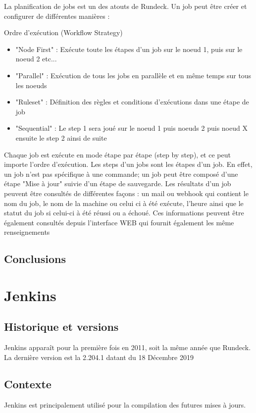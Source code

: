 \documentclass[12pt]{article}
\begin{document}
La planification de jobs est un des atouts de Rundeck. Un job peut être créer et configurer de différentes manières :
\vspace{0.5cm}

Ordre d'exécution (Workflow Strategy)

\vspace{0.5cm}

\begin{itemize}
    \item  "Node First" : Exécute toute les étapes d'un job sur le noeud 1, puis sur le noeud 2 etc...
	\item "Parallel" : Exécution de tous les jobs en parallèle et en même temps sur tous les noeuds
	\item "Ruleset" : Définition des règles et conditions d'exécutions dans une étape de job
	\item "Sequential" : Le step 1 sera joué sur le noeud 1 puis noeuds 2 puis noeud X ensuite le step 2 ainsi de suite
\end{itemize}

\vspace{0.5cm}
Chaque job est exécute en mode étape par étape (step by step), et ce peut importe l'ordre d'exécution.
Les steps d'un jobs sont les étapes d'un job. En effet, un job n'est pas spécifique à une commande; un job peut être composé d'une étape "Mise à jour" suivie d'un étape de sauvegarde.
Les résultats d'un job peuvent être consultés de différentes façons : un mail ou webhook qui contient le nom du job, le nom de la machine ou celui ci à été exécute, l'heure ainsi que le statut du job si celui-ci à été réussi ou a échoué. Ces informations peuvent être également consultés depuis l'interface WEB qui fournit également les même renseignements
\subsection{Conclusions}

\section{Jenkins}
\subsection{Historique et versions}
Jenkins apparaît pour la première fois en 2011, soit la même année que Rundeck. La dernière version est la 2.204.1 datant du 18 Décembre 2019

\subsection{Contexte}
Jenkins est principalement utilisé pour la compilation des futures mises à jours. 
\end{document}
